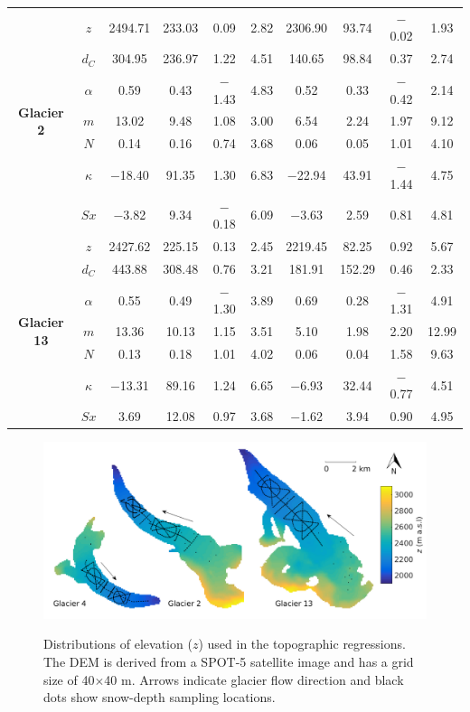 \documentclass{sfuthesis}
\newcommand{\topomap}{Arrows indicate glacier flow direction and black dots show snow-depth sampling locations. }
\begin{document}
{\begin{table}
\begin{tabular}{cc|cccc|cccc}
\multirow{7}{*}{\textbf{Glacier 2}} & $z$ & 2494.71 & 233.03 & 0.09 & 2.82 & 2306.90 & 93.74 & $-$0.02 & 1.93 \\
 & $d_C$ & 304.95 & 236.97 & 1.22 & 4.51 & 140.65 & 98.84 & 0.37 & 2.74 \\
 & $\alpha$ & 0.59 & 0.43 & $-$1.43 & 4.83 & 0.52 & 0.33 & $-$0.42 & 2.14 \\
 & $m$ & 13.02 & 9.48 & 1.08 & 3.00 & 6.54 & 2.24 & 1.97 & 9.12 \\
 & $N$ & 0.14 & 0.16 & 0.74 & 3.68 & 0.06 & 0.05 & 1.01 & 4.10 \\
 & $\kappa$ & $-$18.40 & 91.35 & 1.30 & 6.83 & $-$22.94 & 43.91 & $-$1.44 & 4.75 \\
 & $Sx$ & $-$3.82 & 9.34 & $-$0.18 & 6.09 & $-$3.63 & 2.59 & 0.81 & 4.81 \\ \hline
\multirow{7}{*}{\textbf{Glacier 13}} & $z$ & 2427.62 & 225.15 & 0.13 & 2.45 & 2219.45 & 82.25 & 0.92 & 5.67 \\
 & $d_C$ & 443.88 & 308.48 & 0.76 & 3.21 & 181.91 & 152.29 & 0.46 & 2.33 \\
 & $\alpha$ & 0.55 & 0.49 & $-$1.30 & 3.89 & 0.69 & 0.28 & $-$1.31 & 4.91 \\
 & $m$ & 13.36 & 10.13 & 1.15 & 3.51 & 5.10 & 1.98 & 2.20 & 12.99 \\
 & $N$ & 0.13 & 0.18 & 1.01 & 4.02 & 0.06 & 0.04 & 1.58 & 9.63 \\
 & $\kappa$ & $-$13.31 & 89.16 & 1.24 & 6.65 & $-$6.93 & 32.44 & $-$0.77 & 4.51 \\
 & $Sx$ & 3.69 & 12.08 & 0.97 & 3.68 & $-$1.62 & 3.94 & 0.90 & 4.95
\end{tabular}
\end{table}

\pagebreak
\begin{figure}[H]
	\centering
	\includegraphics[width = \textwidth]{Map_elevation.png}\\
	\caption[Distributions of elevation ($z$)]{Distributions of elevation ($z$) used in the topographic regressions. The DEM is derived from a SPOT-5 satellite image and has a grid size of 40$\times$40 m. \topomap}
	\label{map:elev}
\end{figure}

}
\end{document}
